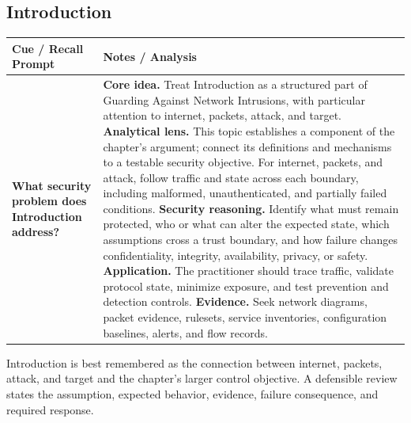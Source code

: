 \documentclass[11pt]{article}
\newcommand{\CornellHeader}{%
\rowcolor{Navy}\color{white}\bfseries Cue / Recall Prompt & \color{white}\bfseries Notes / Analysis\\\hline}
\newcommand{\CornellRow}[2]{%
\cellcolor{CueGray}\RaggedRight\textbf{#1} & \RaggedRight #2\\\hline}
\begin{document}
\subsection*{Introduction}
\begin{longtable}{>{\RaggedRight\arraybackslash}p{}|>{\RaggedRight\arraybackslash}p{}}
\CornellHeader
\CornellRow{What security problem does Introduction address?}{\textbf{Core idea.} Treat Introduction as a structured part of Guarding Against Network Intrusions, with particular attention to internet, packets, attack, and target. \textbf{Analytical lens.} This topic establishes a component of the chapter's argument; connect its definitions and mechanisms to a testable security objective. For internet, packets, and attack, follow traffic and state across each boundary, including malformed, unauthenticated, and partially failed conditions. \textbf{Security reasoning.} Identify what must remain protected, who or what can alter the expected state, which assumptions cross a trust boundary, and how failure changes confidentiality, integrity, availability, privacy, or safety. \textbf{Application.} The practitioner should trace traffic, validate protocol state, minimize exposure, and test prevention and detection controls. \textbf{Evidence.} Seek network diagrams, packet evidence, rulesets, service inventories, configuration baselines, alerts, and flow records.}
\end{longtable}
\begin{topicsummary}
Introduction is best remembered as the connection between internet, packets, attack, and target and the chapter's larger control objective. A defensible review states the assumption, expected behavior, evidence, failure consequence, and required response.
\end{topicsummary}
\end{document}
